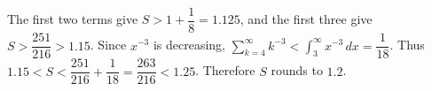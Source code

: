 The first two terms give $S>1+\dfrac{1}{8}=1.125$, and the first three give $S>\dfrac{251}{216}>1.15$. Since $x^{-3}$ is decreasing, $\sum_{k=4}^\infty k^{-3}<\int_3^\infty x^{-3}\,dx=\dfrac{1}{18}$. Thus $1.15<S<\dfrac{251}{216}+\dfrac{1}{18}=\dfrac{263}{216}<1.25$. Therefore $S$ rounds to $\boxed{1.2}$.
